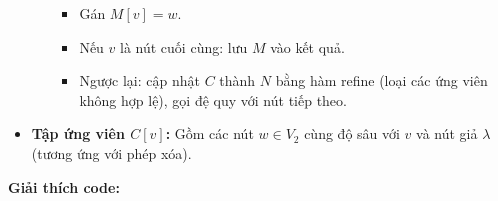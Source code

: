 \documentclass{article}
\begin{document}
\begin{itemize}
\begin{itemize}
        \begin{itemize}
            \item Gán $M[v] = w$.
            \item Nếu $v$ là nút cuối cùng: lưu $M$ vào kết quả.
            \item Ngược lại: cập nhật $C$ thành $N$ bằng hàm refine (loại các ứng viên không hợp lệ), gọi đệ quy với nút tiếp theo.
        \end{itemize}
    \end{itemize}
    \item \textbf{Tập ứng viên $C[v]$:} Gồm các nút $w \in V_2$ cùng độ sâu với $v$ và nút giả $\lambda$ (tương ứng với phép xóa).
\end{itemize}

\textbf{Giải thích code:}
\end{document}
